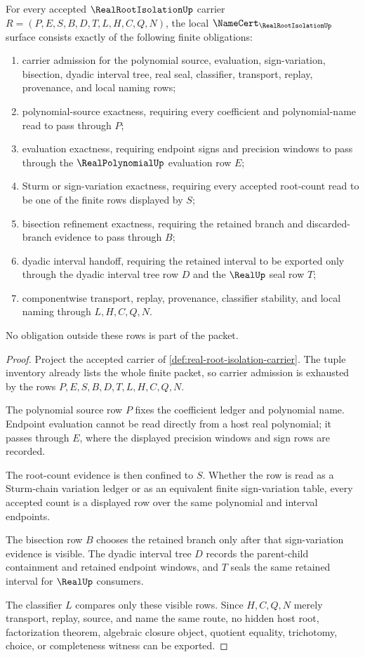 \begin{theorem}
\label{thm:real-root-isolation-namecert-obligations}
For every accepted $\RealRootIsolationUp$ carrier $R=(P,E,S,B,D,T,L,H,C,Q,N)$, the local $\NameCert_{\RealRootIsolationUp}$ surface consists exactly of the following finite obligations:
\begin{enumerate}
\item carrier admission for the polynomial source, evaluation, sign-variation, bisection, dyadic interval tree, real seal, classifier, transport, replay, provenance, and local naming rows;
\item polynomial-source exactness, requiring every coefficient and polynomial-name read to pass through $P$;
\item evaluation exactness, requiring endpoint signs and precision windows to pass through the $\RealPolynomialUp$ evaluation row $E$;
\item Sturm or sign-variation exactness, requiring every accepted root-count read to be one of the finite rows displayed by $S$;
\item bisection refinement exactness, requiring the retained branch and discarded-branch evidence to pass through $B$;
\item dyadic interval handoff, requiring the retained interval to be exported only through the dyadic interval tree row $D$ and the $\RealUp$ seal row $T$;
\item componentwise transport, replay, provenance, classifier stability, and local naming through $L,H,C,Q,N$.
\end{enumerate}
No obligation outside these rows is part of the packet.
\end{theorem}
\begin{proof}
Project the accepted carrier of \autoref{def:real-root-isolation-carrier}. The tuple inventory already lists the whole finite packet, so carrier admission is exhausted by the rows $P,E,S,B,D,T,L,H,C,Q,N$.

The polynomial source row $P$ fixes the coefficient ledger and polynomial name. Endpoint evaluation cannot be read directly from a host real polynomial; it passes through $E$, where the displayed precision windows and sign rows are recorded.

The root-count evidence is then confined to $S$. Whether the row is read as a Sturm-chain variation ledger or as an equivalent finite sign-variation table, every accepted count is a displayed row over the same polynomial and interval endpoints.

The bisection row $B$ chooses the retained branch only after that sign-variation evidence is visible. The dyadic interval tree $D$ records the parent-child containment and retained endpoint windows, and $T$ seals the same retained interval for $\RealUp$ consumers.

The classifier $L$ compares only these visible rows. Since $H,C,Q,N$ merely transport, replay, source, and name the same route, no hidden host root, factorization theorem, algebraic closure object, quotient equality, trichotomy, choice, or completeness witness can be exported.
\end{proof}

